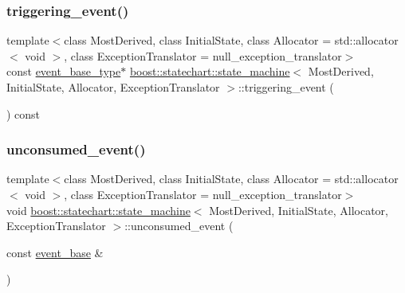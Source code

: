 \subsubsection{\texorpdfstring{triggering\+\_\+event()}{triggering\_event()}}
{\footnotesize\ttfamily template$<$class Most\+Derived, class Initial\+State, class Allocator = std\+::allocator$<$ void $>$, class Exception\+Translator = null\+\_\+exception\+\_\+translator$>$ \\
const \mbox{\hyperlink{classboost_1_1statechart_1_1state__machine_adb0e98d6d780a0977209fa7389b20bcd}{event\+\_\+base\+\_\+type}}$\ast$ \mbox{\hyperlink{classboost_1_1statechart_1_1state__machine}{boost\+::statechart\+::state\+\_\+machine}}$<$ Most\+Derived, Initial\+State, Allocator, Exception\+Translator $>$\+::triggering\+\_\+event (\begin{DoxyParamCaption}{ }\end{DoxyParamCaption}) const\hspace{0.3cm}{\ttfamily [inline]}}

\mbox{\label{classboost_1_1statechart_1_1state__machine_ac9ec2b1cfa39a11852cf1b90e4a2aa12}} 
\subsubsection{\texorpdfstring{unconsumed\+\_\+event()}{unconsumed\_event()}}
{\footnotesize\ttfamily template$<$class Most\+Derived, class Initial\+State, class Allocator = std\+::allocator$<$ void $>$, class Exception\+Translator = null\+\_\+exception\+\_\+translator$>$ \\
void \mbox{\hyperlink{classboost_1_1statechart_1_1state__machine}{boost\+::statechart\+::state\+\_\+machine}}$<$ Most\+Derived, Initial\+State, Allocator, Exception\+Translator $>$\+::unconsumed\+\_\+event (\begin{DoxyParamCaption}\item[{const \mbox{\hyperlink{classboost_1_1statechart_1_1event__base}{event\+\_\+base}} \&}]{ }\end{DoxyParamCaption})\hspace{0.3cm}{\ttfamily [inline]}}

